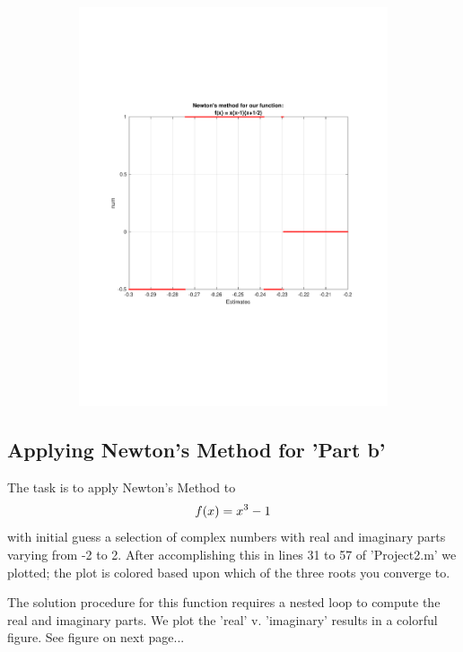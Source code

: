 \documentclass[12pt]{article} %
\begin{document}
\begin{figure}[ht!]
\begin{subfigure}{0.4\textwidth}
        \includegraphics[width=\textwidth]{fig1.pdf}
        \caption{\small }
        \label{}
    \end{subfigure}
\end{figure}

  \hfill\newpage
  \subsection{Applying Newton's Method for 'Part b'}
  The task is to apply Newton's Method to 
  \begin{equation}\label{eqn} f(x) = x\textsuperscript{3} - 1 \end{equation}
  with initial guess a selection of complex numbers with real and imaginary parts varying from -2 to 2. After accomplishing this in lines 31 to 57 of 'Project2.m' we plotted; the plot is colored based upon which of the three roots you converge to.\par
  The solution procedure for this function requires a nested loop to compute the real and imaginary parts.  We plot the 'real' v. 'imaginary' results in a colorful figure.  See figure on next page...
  
\end{document}
